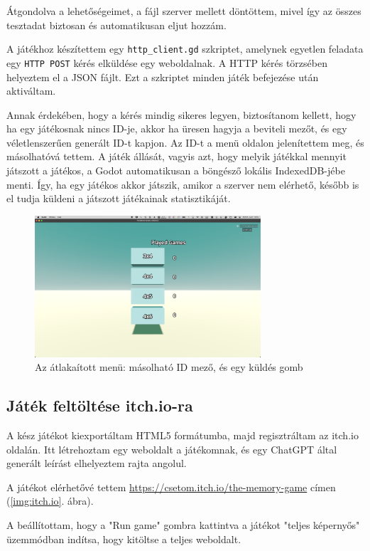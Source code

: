 Átgondolva a lehetőségeimet, a fájl szerver mellett döntöttem, mivel így az összes tesztadat biztosan és automatikusan eljut hozzám.

A játékhoz készítettem egy \lstinline{http_client.gd} szkriptet, amelynek egyetlen feladata egy \lstinline{HTTP POST} kérés elküldése egy weboldalnak. A HTTP kérés törzsében helyeztem el a JSON fájlt. Ezt a szkriptet minden játék befejezése után aktiváltam.

Annak érdekében, hogy a kérés mindig sikeres legyen, biztosítanom kellett, 
hogy ha egy játékosnak nincs ID-je, akkor ha üresen hagyja a beviteli mezőt, 
és egy véletlenszerűen generált ID-t kapjon. 
Az ID-t a menü oldalon jelenítettem meg, és másolhatóvá tettem.
A játék állását, vagyis azt, hogy melyik játékkal mennyit játszott a játékos, a Godot automatikusan a böngésző lokális IndexedDB-jébe menti.
Így, ha egy játékos akkor játszik, amikor a szerver nem elérhető, később is el tudja küldeni a játszott játékainak statisztikáját.\begin{figure}[h]
    \centering
    \includegraphics[width=0.75\textwidth]{img/menu_remake.png}
    \caption{Az átlakaított menü: másolható ID mező, és egy küldés gomb}
    \label{img:menu_remake}  
\end{figure}

\subsection{Játék feltöltése itch.io-ra}

A kész játékot kiexportáltam HTML5 formátumba, majd regisztráltam az itch.io oldalán. Itt létrehoztam egy weboldalt a játékomnak, és egy ChatGPT által generált leírást elhelyeztem rajta angolul.

A játékot elérhetővé tettem \url{https://csetom.itch.io/the-memory-game} címen (\ref{img:itch.io}. ábra). 

A beállítottam, hogy a "Run game" gombra kattintva a játékot "teljes képernyős" üzemmódban indítsa, hogy kitöltse a teljes weboldalt. 

